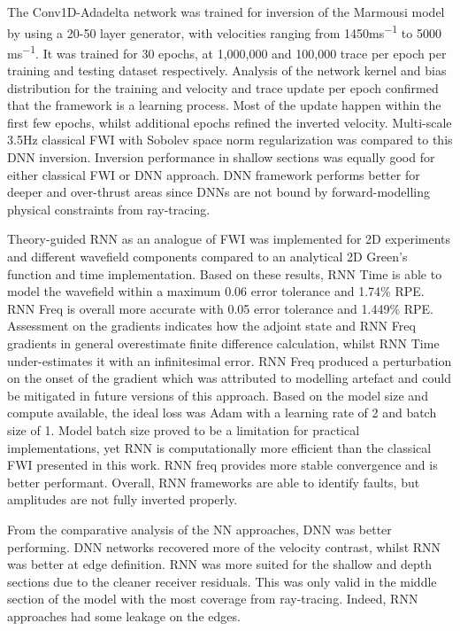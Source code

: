 The Conv1D-Adadelta network was trained for inversion of the Marmousi model by using a 20-50 layer generator, with velocities ranging from 1450\si{ms^{-1}} to 5000 \si{ms^{-1}}. It was trained for 30 epochs, at 1,000,000 and 100,000 trace per epoch per training and testing dataset respectively. Analysis of the network kernel and bias distribution for the training and velocity and trace update per epoch confirmed that the framework is a learning process. Most of the update happen within the first few epochs, whilst additional epochs refined the inverted velocity. Multi-scale 3.5Hz classical FWI with Sobolev space norm regularization was compared to this DNN inversion. Inversion performance in shallow sections was equally good for either classical FWI or DNN approach. DNN framework performs better for deeper and over-thrust areas since DNNs are not bound by forward-modelling physical constraints from ray-tracing.

Theory-guided RNN as an analogue of FWI was implemented for 2D experiments and different wavefield components compared to an analytical 2D Green's function and time implementation. Based on these results, RNN Time is able to model the wavefield within a maximum 0.06 error tolerance and 1.74\% RPE. RNN Freq is overall more accurate with 0.05 error tolerance and 1.449\% RPE. Assessment on the gradients indicates how the adjoint state and RNN Freq gradients in general overestimate finite difference calculation, whilst RNN Time under-estimates it with an infinitesimal error. RNN Freq produced a perturbation on the onset of the gradient which was attributed to modelling artefact and could be mitigated in future versions of this approach. Based on the model size and compute available, the ideal loss was Adam with a learning rate of 2 and batch size of 1. Model batch size proved to be a limitation for practical implementations, yet RNN is computationally more efficient than the classical FWI presented in this work. RNN freq provides more stable convergence and is better performant. Overall, RNN frameworks are able to identify faults, but amplitudes are not fully inverted properly.

From the comparative analysis of the NN approaches, DNN was better performing. DNN networks recovered more of the velocity contrast, whilst RNN was better at edge definition. RNN was more suited for the shallow and depth sections due to the cleaner receiver residuals. This was only valid in the middle section of the model with the most coverage from ray-tracing. Indeed, RNN approaches had some leakage on the edges.

